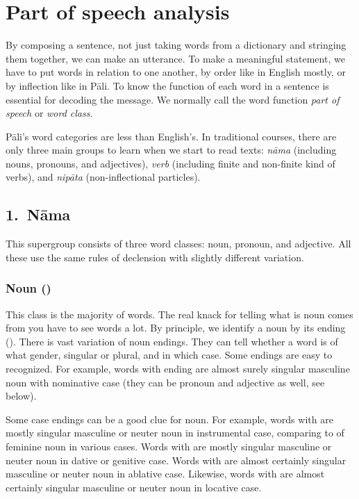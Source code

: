 \chapter{Part of speech analysis}\label{chap:pos}

By composing a sentence, not just taking words from a dictionary and stringing them together, we can make an utterance. To make a meaningful statement, we have to put words in relation to one another, by order like in English mostly, or by inflection like in P\=ali. To know the function of each word in a sentence is essential for decoding the message. We normally call the word function \emph{part of speech} or \emph{word class}.

P\=ali's word categories are less than English's. In traditional courses, there are only three main groups to learn when we start to read texts: \emph{n\=ama} (including nouns, pronouns, and adjectives), \emph{verb} (including finite and non-finite kind of verbs), and \emph{nip\=ata} (non-inflectional particles).

{}
\section*{1.\ N\=ama}

This supergroup consists of three word classes: noun, pronoun, and adjective. All these use the same rules of declension with slightly different variation.

{}
\subsection*{Noun ()}

This class is the majority of words. The real knack for telling what is noun comes from you have to see words a lot. By principle, we identify a noun by its ending (). There is vast variation of noun endings. They can tell whether a word is of what gender, singular or plural, and in which case. Some endings are easy to recognized. For example, words with  ending are almost surely singular masculine noun with nominative case (they can be pronoun and adjective as well, see below). 

Some case endings can be a good clue for noun. For example, words with  are mostly singular masculine or neuter noun in instrumental case, comparing to  of feminine noun in various cases. Words with  are mostly singular masculine or neuter noun in dative or genitive case. Words with  are almost certainly singular masculine or neuter noun in ablative case. Likewise, words with  are almost certainly singular masculine or neuter noun in locative case.

